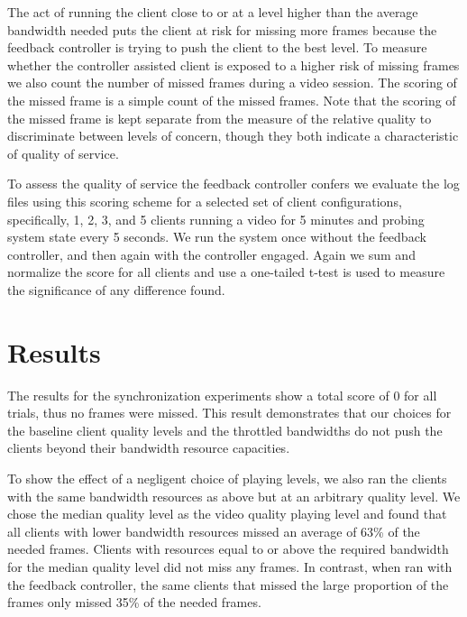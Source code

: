 \documentclass{sig-alternate}
\begin{document}
The act of running the client close to or at a level higher than the
average bandwidth needed puts the client at risk for missing more
frames because the feedback controller is trying to push the client to
the best level.  To measure whether the controller assisted client is
exposed to a higher risk of missing frames we also count the number of
missed frames during a video session.  The scoring of the missed frame
is a simple count of the missed frames.  Note that the scoring of the
missed frame is kept separate from the measure of the relative quality
to discriminate between levels of concern, though they both indicate a
characteristic of quality of service.

To assess the quality of service the feedback controller confers we
evaluate the log files using this scoring scheme for a selected set of
client configurations, specifically, 1, 2, 3, and 5 clients running a
video for 5 minutes and probing system state every 5 seconds.  We run
the system once without the feedback controller, and then again with
the controller engaged.  Again we sum and normalize the score for all
clients and use a one-tailed t-test is used to measure the
significance of any difference found.


\section{Results} \label{results}

The results for the synchronization experiments show a total score of
0 for all trials, thus no frames were missed.  This result
demonstrates that our choices for the baseline client quality levels
and the throttled bandwidths do not push the clients beyond their
bandwidth resource capacities.

To show the effect of a negligent choice of playing levels, we also
ran the clients with the same bandwidth resources as above but at an
arbitrary quality level.  We chose the median quality level as the
video quality playing level and found that all clients with lower
bandwidth resources missed an average of 63\% of the needed frames.
Clients with resources equal to or above the required bandwidth for
the median quality level did not miss any frames.  In contrast, when
ran with the feedback controller, the same clients that missed the
large proportion of the frames only missed 35\% of the needed frames.
\end{document}
